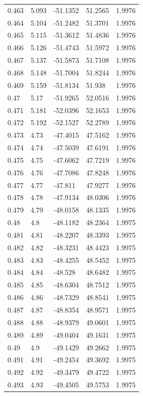 \begin{tabular}{lllll}
0.463 & 5.093 & -51.1352 & 51.2565 & 1.9976 \\
0.464 & 5.104 & -51.2482 & 51.3701 & 1.9976 \\
0.465 & 5.115 & -51.3612 & 51.4836 & 1.9976 \\
0.466 & 5.126 & -51.4743 & 51.5972 & 1.9976 \\
0.467 & 5.137 & -51.5873 & 51.7108 & 1.9976 \\
0.468 & 5.148 & -51.7004 & 51.8244 & 1.9976 \\
0.469 & 5.159 & -51.8134 & 51.938 & 1.9976 \\
0.47 & 5.17 & -51.9265 & 52.0516 & 1.9976 \\
0.471 & 5.181 & -52.0396 & 52.1653 & 1.9976 \\
0.472 & 5.192 & -52.1527 & 52.2789 & 1.9976 \\
0.473 & 4.73 & -47.4015 & 47.5162 & 1.9976 \\
0.474 & 4.74 & -47.5039 & 47.6191 & 1.9976 \\
0.475 & 4.75 & -47.6062 & 47.7219 & 1.9976 \\
0.476 & 4.76 & -47.7086 & 47.8248 & 1.9976 \\
0.477 & 4.77 & -47.811 & 47.9277 & 1.9976 \\
0.478 & 4.78 & -47.9134 & 48.0306 & 1.9976 \\
0.479 & 4.79 & -48.0158 & 48.1335 & 1.9976 \\
0.48 & 4.8 & -48.1182 & 48.2364 & 1.9975 \\
0.481 & 4.81 & -48.2207 & 48.3393 & 1.9975 \\
0.482 & 4.82 & -48.3231 & 48.4423 & 1.9975 \\
0.483 & 4.83 & -48.4255 & 48.5452 & 1.9975 \\
0.484 & 4.84 & -48.528 & 48.6482 & 1.9975 \\
0.485 & 4.85 & -48.6304 & 48.7512 & 1.9975 \\
0.486 & 4.86 & -48.7329 & 48.8541 & 1.9975 \\
0.487 & 4.87 & -48.8354 & 48.9571 & 1.9975 \\
0.488 & 4.88 & -48.9379 & 49.0601 & 1.9975 \\
0.489 & 4.89 & -49.0404 & 49.1631 & 1.9975 \\
0.49 & 4.9 & -49.1429 & 49.2662 & 1.9975 \\
0.491 & 4.91 & -49.2454 & 49.3692 & 1.9975 \\
0.492 & 4.92 & -49.3479 & 49.4722 & 1.9975 \\
0.493 & 4.93 & -49.4505 & 49.5753 & 1.9975 \\

\end{tabular}
